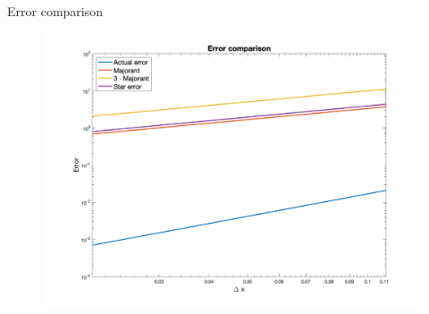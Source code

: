 \documentclass{beamer}
\begin{document}
    \begin{frame}{Error comparison}
        \begin{figure}
            \includegraphics[scale=0.18]{errors}
        \end{figure}
    \end{frame}
\end{document}
